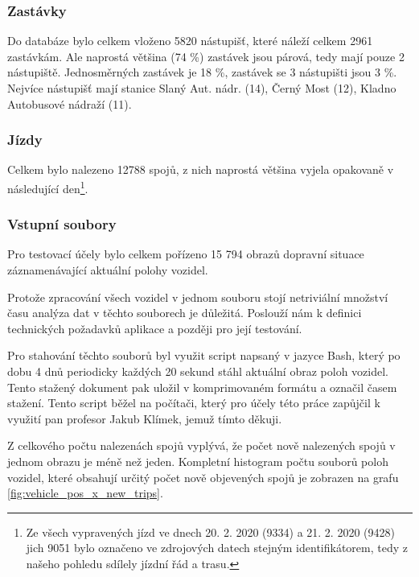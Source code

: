 \subsubsection{Zastávky} \label{subsubsection:zastavky}

Do databáze bylo celkem vloženo 5820 nástupišť, které náleží celkem 2961 zastávkám. Ale naprostá většina (74 \%) zastávek jsou párová, tedy mají pouze 2 nástupiště. Jednosměrných zastávek je 18 \%, zastávek se 3 nástupišti jsou 3 \%. Nejvíce nástupišť mají stanice Slaný Aut. nádr. (14), Černý Most (12), Kladno Autobusové nádraží (11).

\subsubsection{Jízdy}

Celkem bylo nalezeno 12788 spojů, z nich naprostá většina vyjela opakovaně v následující den\footnote{Ze všech vypravených jízd ve dnech 20. 2. 2020 (9334) a 21. 2. 2020 (9428) jich 9051 bylo označeno ve zdrojových datech stejným identifikátorem, tedy z našeho pohledu sdílely jízdní řád a trasu.}.

\subsubsection{Vstupní soubory} \label{subsubsection:vstupni_soubory}

Pro testovací účely bylo celkem pořízeno 15 794 obrazů dopravní situace záznamenávající aktuální polohy vozidel.

\bigbreak

Protože zpracování všech vozidel v jednom souboru stojí netriviální množství času analýza dat v těchto souborech je důležitá. Poslouží nám k definici technických požadavků aplikace a později pro její testování.

\bigbreak

Pro stahování těchto souborů byl využit script napsaný v jazyce Bash, který po dobu 4 dnů periodicky každých 20 sekund stáhl aktuální obraz poloh vozidel. Tento stažený dokument pak uložil v komprimovaném formátu a označil časem stažení. Tento script běžel na počítači, který pro účely této práce zapůjčil k využití pan profesor Jakub Klímek, jemuž tímto děkuji.

\bigbreak

Z celkového počtu nalezenách spojů vyplývá, že počet nově nalezených spojů v jednom obrazu je méně než jeden. Kompletní histogram počtu souborů poloh vozidel, které obsahují určitý počet nově objevených spojů je zobrazen na grafu \ref{fig:vehicle_pos_x_new_trips}.

